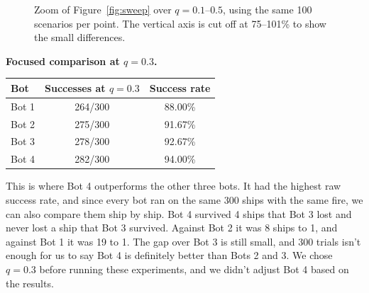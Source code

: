 \documentclass[11pt]{article}
\begin{document}
\begin{figure}[h]
\centering
{}
\caption{Zoom of Figure~\ref{fig:sweep} over $q = 0.1$--$0.5$, using the same 100 scenarios per point. The vertical axis is cut off at 75--101\% to show the small differences.}
\label{fig:zoom}
\end{figure}

\begin{samepage}
\textbf{Focused comparison at $q = 0.3$.}

\begin{center}
\begin{tabular}{lcc}
\toprule
Bot & Successes at $q=0.3$ & Success rate \\
\midrule
Bot 1 & 264/300 & 88.00\% \\
Bot 2 & 275/300 & 91.67\% \\
Bot 3 & 278/300 & 92.67\% \\
Bot 4 & 282/300 & 94.00\% \\
\bottomrule
\end{tabular}
\end{center}
\end{samepage}

This is where Bot 4 outperforms the other three bots. It had the highest raw success rate, and since every bot ran on the same 300 ships with the same fire, we can also compare them ship by ship. Bot 4 survived 4 ships that Bot 3 lost and never lost a ship that Bot 3 survived. Against Bot 2 it was 8 ships to 1, and against Bot 1 it was 19 to 1. The gap over Bot 3 is still small, and 300 trials isn't enough for us to say Bot 4 is definitely better than Bots 2 and 3. We chose $q = 0.3$ before running these experiments, and we didn't adjust Bot 4 based on the results.
\end{document}
